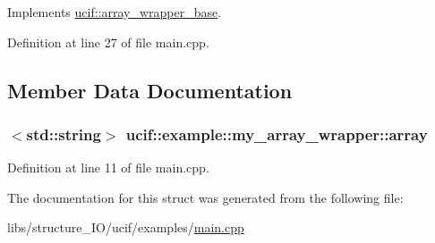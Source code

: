 Implements \hyperlink{structucif_1_1array__wrapper__base_a000b5a6968937d34dbc194dfdb667116}{ucif\-::array\-\_\-wrapper\-\_\-base}.



Definition at line 27 of file main.\-cpp.



\subsection{Member Data Documentation}
\hypertarget{structucif_1_1example_1_1my__array__wrapper_aba0c527b2f8e3e2ccc7b6bb650e55563}{
\subsubsection[{array}]{$<$std\-::string$>$ ucif\-::example\-::my\-\_\-array\-\_\-wrapper\-::array}}\label{structucif_1_1example_1_1my__array__wrapper_aba0c527b2f8e3e2ccc7b6bb650e55563}


Definition at line 11 of file main.\-cpp.



The documentation for this struct was generated from the following file\-:\begin{DoxyCompactItemize}
\item 
libs/structure\-\_\-\-I\-O/ucif/examples/\hyperlink{main_8cpp}{main.\-cpp}\end{DoxyCompactItemize}
